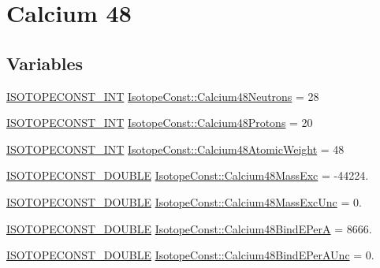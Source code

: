 \hypertarget{group___isotope_const-_calcium-_ca48}{}\section{Calcium 48}
\label{group___isotope_const-_calcium-_ca48}
\subsection*{Variables}
\begin{DoxyCompactItemize}
\item 
\mbox{\hyperlink{group___isotope_const-_macros_ga5f18360b3e99483a35c32d789e62621c}{I\+S\+O\+T\+O\+P\+E\+C\+O\+N\+S\+T\+\_\+\+I\+NT}} \mbox{\hyperlink{group___isotope_const-_calcium-_ca48_ga9a14bafed783447f8a713d79d99e96b9}{Isotope\+Const\+::\+Calcium48\+Neutrons}} = 28
\item 
\mbox{\hyperlink{group___isotope_const-_macros_ga5f18360b3e99483a35c32d789e62621c}{I\+S\+O\+T\+O\+P\+E\+C\+O\+N\+S\+T\+\_\+\+I\+NT}} \mbox{\hyperlink{group___isotope_const-_calcium-_ca48_gabbb5e5f27e7040c67047019f4320e051}{Isotope\+Const\+::\+Calcium48\+Protons}} = 20
\item 
\mbox{\hyperlink{group___isotope_const-_macros_ga5f18360b3e99483a35c32d789e62621c}{I\+S\+O\+T\+O\+P\+E\+C\+O\+N\+S\+T\+\_\+\+I\+NT}} \mbox{\hyperlink{group___isotope_const-_calcium-_ca48_ga18753ea168ab0a648b8f35b602c34cc5}{Isotope\+Const\+::\+Calcium48\+Atomic\+Weight}} = 48
\item 
\mbox{\hyperlink{group___isotope_const-_macros_ga8f45a7272ce02c0b4c65c44636ed719a}{I\+S\+O\+T\+O\+P\+E\+C\+O\+N\+S\+T\+\_\+\+D\+O\+U\+B\+LE}} \mbox{\hyperlink{group___isotope_const-_calcium-_ca48_ga57ca4aa00550144d2b512bb373680fad}{Isotope\+Const\+::\+Calcium48\+Mass\+Exc}} = -\/44224.
\item 
\mbox{\hyperlink{group___isotope_const-_macros_ga8f45a7272ce02c0b4c65c44636ed719a}{I\+S\+O\+T\+O\+P\+E\+C\+O\+N\+S\+T\+\_\+\+D\+O\+U\+B\+LE}} \mbox{\hyperlink{group___isotope_const-_calcium-_ca48_gae13c0e60129c850d2c278d3794243a14}{Isotope\+Const\+::\+Calcium48\+Mass\+Exc\+Unc}} = 0.
\item 
\mbox{\hyperlink{group___isotope_const-_macros_ga8f45a7272ce02c0b4c65c44636ed719a}{I\+S\+O\+T\+O\+P\+E\+C\+O\+N\+S\+T\+\_\+\+D\+O\+U\+B\+LE}} \mbox{\hyperlink{group___isotope_const-_calcium-_ca48_gafa6a2d848987e9651114ca495605da86}{Isotope\+Const\+::\+Calcium48\+Bind\+E\+PerA}} = 8666.
\item 
\mbox{\hyperlink{group___isotope_const-_macros_ga8f45a7272ce02c0b4c65c44636ed719a}{I\+S\+O\+T\+O\+P\+E\+C\+O\+N\+S\+T\+\_\+\+D\+O\+U\+B\+LE}} \mbox{\hyperlink{group___isotope_const-_calcium-_ca48_gab42bb4ac5d3f055ba2c08d576355627b}{Isotope\+Const\+::\+Calcium48\+Bind\+E\+Per\+A\+Unc}} = 0.

\end{DoxyCompactItemize}
